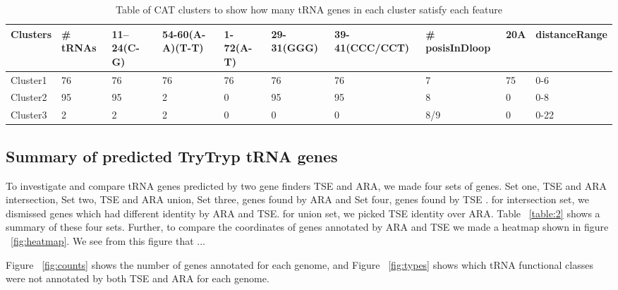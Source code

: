 \documentclass[
10pt, %
a4paper, %
oneside, %
headinclude,footinclude, %
BCOR5mm, %
]{scrartcl}
\begin{document}
\begin{table}[hbt]
\caption{Table of CAT clusters to show how many tRNA genes in each cluster satisfy each feature}
\begin{adjustbox}{width=\columnwidth,center}
\begin{tabular}{|l|lllllllll|}
\hline
Clusters & \# tRNAs & 11–24(C-G) & 54-60(A-A)(T-T) & 1-72(A-T) & 29-31(GGG) & 39-41(CCC/CCT) & \#  posisInDloop & 20A & distanceRange \\
\hline
Cluster1 & 76 & 76 & 76 & 76 & 76 & 76 & 7 & 75 & 0-6\\
Cluster2 & 95 & 95 & 2 & 0 & 95 & 95 & 8 & 0 & 0-8\\
Cluster3 & 2 & 2 & 2 & 0 & 0 & 0 & 8/9 & 0 & 0-22\\
\hline
\end{tabular}
\label{table:1}
\end{adjustbox}
\end{table}




\subsection{\textbf{Summary of predicted TryTryp tRNA genes}}

To investigate and compare tRNA genes predicted by two gene finders TSE and ARA, we made four sets of genes. Set one, TSE and ARA intersection, Set two, TSE and ARA union, Set three, genes found by ARA and Set four, genes found by TSE . for intersection set, we dismissed genes which had different identity by ARA and TSE. for union set, we picked TSE identity over ARA. Table  ~\ref{table:2} shows a summary of these four sets. Further, to compare the coordinates of genes annotated by ARA and TSE we made a heatmap shown in figure ~\ref{fig:heatmap}. We see from this figure that ... 

Figure ~\ref{fig:counts} shows the number of genes annotated for each genome, and Figure ~\ref{fig:types} shows which tRNA functional classes were not annotated by both TSE and ARA for each genome. 
\end{document}
